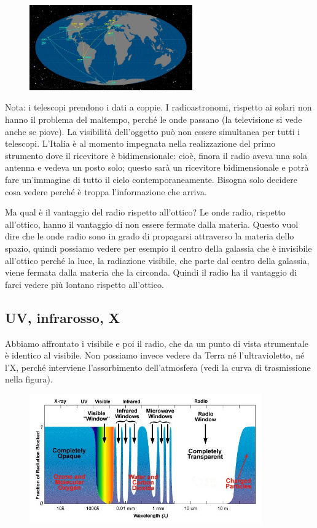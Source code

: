 \begin{figure}[H]
    \centering
    \includegraphics[width=7cm]{34.jpg}
\end{figure}

Nota: i telescopi prendono i dati a coppie. 
I radioastronomi, rispetto ai solari non hanno il problema del maltempo, perché le onde passano (la televisione si vede anche se piove). La visibilità dell'oggetto può non essere simultanea per tutti i telescopi. L'Italia è al momento impegnata nella realizzazione del primo strumento dove il ricevitore è bidimensionale: cioè, finora il radio aveva una sola antenna e vedeva un posto solo; questo sarà un ricevitore bidimensionale e potrà fare un'immagine di tutto il cielo contemporaneamente. Bisogna solo decidere cosa vedere perché è troppa l'informazione che arriva.

Ma qual è il vantaggio del radio rispetto all'ottico? Le onde radio, rispetto all'ottico, hanno il vantaggio di non essere fermate dalla materia. Questo vuol dire che le onde radio sono in grado di propagarsi attraverso la materia dello spazio, quindi possiamo vedere per esempio il centro della galassia che è invisibile all'ottico perché la luce, la radiazione visibile, che parte dal centro della galassia, viene fermata dalla materia che la circonda. Quindi il radio ha il vantaggio di farci vedere più lontano rispetto all'ottico.

\subsection{UV, infrarosso, X}

Abbiamo affrontato i visibile e poi il radio, che da un punto di vista strumentale è identico al visibile. Non possiamo invece vedere da Terra né l'ultravioletto, né l'X, perché interviene l'assorbimento dell'atmosfera (vedi la curva di trasmissione nella figura).

\begin{figure}[H]
    \centering
    \includegraphics[width=10cm]{35.jpg}
\end{figure}

